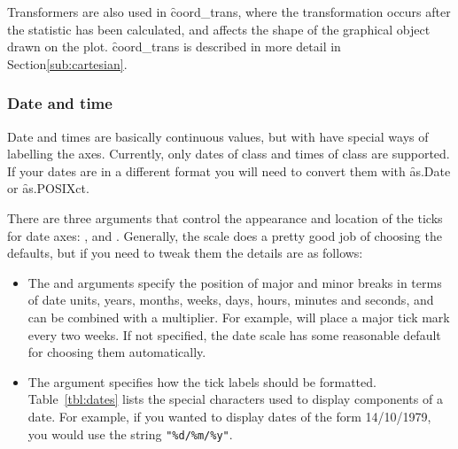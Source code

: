 Transformers are also used in \f{coord_trans}, where the transformation occurs after the statistic has been calculated, and affects the shape of the graphical object drawn on the plot. \f{coord_trans} is described in more detail in Section\ref{sub:cartesian}.

\subsubsection{Date and time}
\label{sub:scale-date}

Date and times are basically continuous values, but with have special ways of labelling the axes. Currently, only dates of class  and times of class  are supported. If your dates are in a different format you will need to convert them with \f{as.Date} or \f{as.POSIXct}.

There are three arguments that control the appearance and location of the ticks for date axes: ,  and . Generally, the scale does a pretty good job of choosing the defaults, but if you need to tweak them the details are as follows:

\begin{itemize}
  \item The  and  arguments specify the position of major and minor breaks in terms of date units, years, months, weeks, days, hours, minutes and seconds, and can be combined with a multiplier.  For example,  will place a major tick mark every two weeks.  If not specified, the date scale has some reasonable default for choosing them automatically.
  
  \item The  argument specifies how the tick labels should be formatted. Table~\ref{tbl:dates} lists the special characters used to display components of a date.  For example, if you wanted to display dates of the form 14/10/1979, you would use the string \verb|"%d/%m/%y"|.
\end{itemize}

